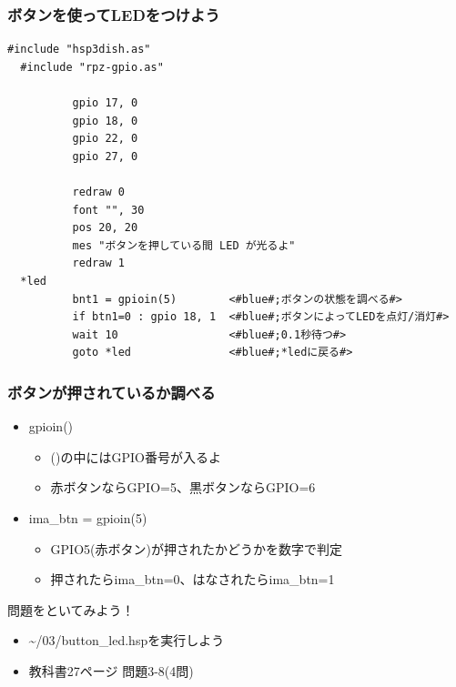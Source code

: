 \begin{frame}[fragile]
  \frametitle{ボタンを使ってLEDをつけよう}
  \begin{lstlisting}[title=\sim/03/button\_led.hsp, label=button_led.hsp]
  #include "hsp3dish.as"
  #include "rpz-gpio.as"
  
          gpio 17, 0
          gpio 18, 0
          gpio 22, 0
          gpio 27, 0

          redraw 0
          font "", 30
          pos 20, 20
          mes "ボタンを押している間 LED が光るよ"
          redraw 1
  *led
          bnt1 = gpioin(5)        <#blue#;ボタンの状態を調べる#>
          if btn1=0 : gpio 18, 1  <#blue#;ボタンによってLEDを点灯/消灯#>
          wait 10                 <#blue#;0.1秒待つ#>
          goto *led               <#blue#;*ledに戻る#>
  \end{lstlisting}
\end{frame}

\begin{frame}
  \frametitle{ボタンが押されているか調べる}
  \begin{itemize}
    \item gpioin()
          \begin{itemize}
            \item ()の中にはGPIO番号が入るよ
            \item 赤ボタンならGPIO=5、黒ボタンならGPIO=6
          \end{itemize}
    \item ima\_btn = gpioin(5)
          \begin{itemize}
            \item GPIO5(赤ボタン)が押されたかどうかを数字で判定
            \item 押されたらima\_btn=0、はなされたらima\_btn=1
          \end{itemize}
  \end{itemize}
\end{frame}

\begin{frame}
  \begin{exampleblock}{問題をといてみよう！}
    \begin{itemize}
      \item \sim/03/button\_led.hspを実行しよう
      \item 教科書27ページ 問題3-8(4問)
    \end{itemize}
  \end{exampleblock} 
\end{frame}

